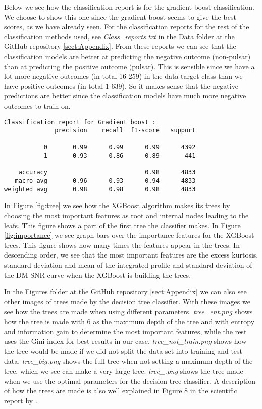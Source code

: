 \documentclass[12pt,a4paper,english]{article}
\begin{document}
Below we see how the classification report is for the gradient boost classification. We choose to show this one since the gradient boost seems to give the best scores, as we have already seen. For the classification reports for the rest of the classification methods used, see \textit{Class\_reports.txt} in the Data folder at the GitHub repository \ref{sect:Appendix}. From these reports we can see that the classification models are better at predicting the negative outcome (non-pulsar) than at predicting the positive outcome (pulsar). This is sensible since we have a lot more negative outcomes (in total 16 259) in the data target class than we have positive outcomes (in total 1 639). So it makes sense that the negative predictions are better since the classification models have much more negative outcomes to train on.
\begin{lstlisting}
Classification report for Gradient boost :
              precision    recall  f1-score   support

           0       0.99      0.99      0.99      4392
           1       0.93      0.86      0.89       441

    accuracy                           0.98      4833
   macro avg       0.96      0.93      0.94      4833
weighted avg       0.98      0.98      0.98      4833
\end{lstlisting}

In Figure \ref{fig:tree} we see how the XGBoost algorithm makes its trees by choosing the most important features as root and internal nodes leading to the leafs. This figure shows a part of the first tree the classifier makes. In Figure \ref{fig:importance} we see graph bars over the importance features for the XGBoost trees. This figure shows how many times the features appear in the trees. In descending order, we see that the most important features are the excess kurtosis, standard deviation and mean of the integrated profile and standard deviation of the DM-SNR curve when the XGBoost is building the trees. 

In the Figures folder at the GitHub repository \ref{sect:Appendix} we can also see other images of trees made by the decision tree classifier. With these images we see how the trees are made when using different parameters. \textit{tree\_ent.png} shows how the tree is made with 6 as the maximum depth of the tree and with entropy and information gain to determine the most important features, while the rest uses the Gini index for best results in our case. \textit{tree\_not\_train.png} shows how the tree would be made if we did not split the data set into training and test data. \textit{tree\_big.png} shows the full tree when not setting a maximum depth of the tree, which we see can make a very large tree. \textit{tree\_.png} shows the tree made when we use the optimal parameters for the decision tree classifier. A description of how the trees are made is also well explained in Figure 8 in the scientific report by \citet{pulsar_art}.
\end{document}
